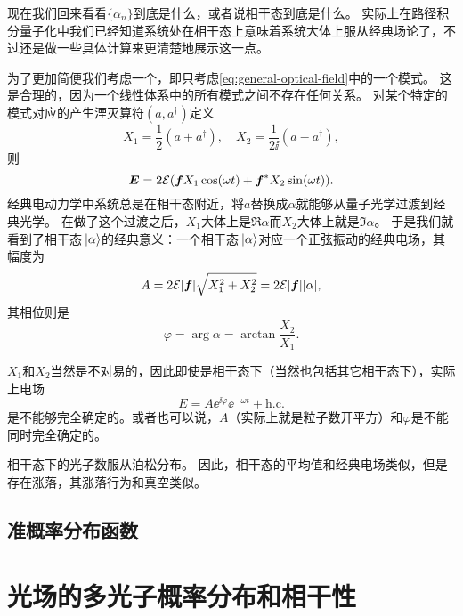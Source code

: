 现在我们回来看看$\{\alpha_n\}$到底是什么，或者说相干态到底是什么。
实际上在路径积分量子化中我们已经知道系统处在相干态上意味着系统大体上服从经典场论了，不过还是做一些具体计算来更清楚地展示这一点。

为了更加简便我们考虑一个，即只考虑\eqref{eq:general-optical-field}中的一个模式。
这是合理的，因为一个线性体系中的所有模式之间不存在任何关系。
对某个特定的模式对应的产生湮灭算符$(a, a^\dagger)$定义
\begin{equation}
    X_1 = \frac{1}{2} (a + a^\dagger), \quad X_2 = \frac{1}{2\ii} (a - a^\dagger),
\end{equation}
则
\begin{equation}
    \vb*{E} = 2 \mathcal{E} (\vb*{f} X_1 \cos(\omega t) + \vb*{f}^* X_2 \sin(\omega t)).
\end{equation}
经典电动力学中系统总是在相干态附近，将$a$替换成$\alpha$就能够从量子光学过渡到经典光学。
在做了这个过渡之后，$X_1$大体上是$\Re{\alpha}$而$X_2$大体上就是$\Im{\alpha}$。
于是我们就看到了相干态$\ket*{\alpha}$的经典意义：一个相干态$\ket*{\alpha}$对应一个正弦振动的经典电场，其幅度为
\begin{equation}
    A = 2 \mathcal{E} \abs{\vb*{f}} \sqrt{X_1^2 + X_2^2} = 2 \mathcal{E} \abs{\vb*{f}} \abs{\alpha},
\end{equation}
其相位则是
\begin{equation}
    \varphi = \arg \alpha = \arctan \frac{X_2}{X_1}.
\end{equation}

$X_1$和$X_2$当然是不对易的，因此即使是相干态下（当然也包括其它相干态下），实际上电场
\begin{equation}
    E = A \ee^{\ii \varphi} \ee^{- \omega t} + \text{h.c.}
\end{equation}
是不能够完全确定的。或者也可以说，$A$（实际上就是粒子数开平方）和$\varphi$是不能同时完全确定的。

相干态下的光子数服从泊松分布。
因此，相干态的平均值和经典电场类似，但是存在涨落，其涨落行为和真空类似。

\subsection{准概率分布函数}



\section{光场的多光子概率分布和相干性}

